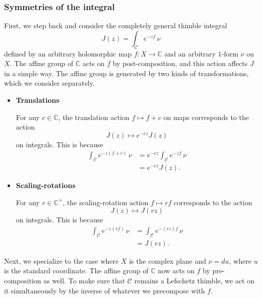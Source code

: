 \documentclass{article}
\newcommand{\maps}{\colon}
\newcommand{\C}{\mathbb{C}}
\theoremstyle{definition}
\theoremstyle{plain}
\begin{document}
\subsubsection{Symmetries of the integral}\label{sec:int-symm}
First, we step back and consider the completely general thimble integral
\[ J(z) = \int_{\mathcal{C}} e^{-zf}\,\nu \]
defined by an arbitrary holomorphic map $f \maps X \to \C$ and an arbitrary $1$-form $\nu$ on $X$. The affine group of $\C$ acts on $f$ by post-composition, and this action affects $J$ in a simple way. The affine group is generated by two kinds of transformations, which we consider separately.
\begin{itemize}
\item[] \textbf{Translations}

For any $c \in \C$, the translation action $f \mapsto f + c$ on maps corresponds to the action
\[ J(z) \mapsto e^{-cz} J(z) \]
on integrals. This is because
\begin{align*}
\int_\mathcal{C} e^{-z(f + c)}\,\nu & = e^{-cz} \int_\mathcal{C} e^{-zf}\,\nu \\
& = e^{-cz} J(z).
\end{align*}
\item[] \textbf{Scaling-rotations}

For any $r \in \C^\times$, the scaling-rotation action $f \mapsto rf$ corresponds to the action
\[ J(z) \mapsto J(rz) \]
on integrals. This is because
\begin{align*}
\int_\mathcal{C} e^{-z(rf)}\,\nu & = \int_\mathcal{C} e^{-(rz)f}\,\nu \\
& = J(rz).
\end{align*}
\end{itemize}
Next, we specialize to the case where $X$ is the complex plane and $\nu = du$, where $u$ is the standard coordinate. The affine group of $\C$ now acts on $f$ by pre-composition as well. To make sure that $\mathcal{C}$ remains a Lefschetz thimble, we act on it simultaneously by the inverse of whatever we precompose with $f$.
\end{document}
